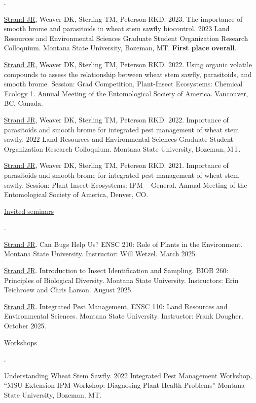 \documentclass[10pt,letterpaper]{article}
\newcounter{cvnumi}
\newenvironment{cvnum}{\begin{list}{\arabic{cvnumi}.}{\usecounter{cvnumi}\setlength{\leftmargin}{2.2em}\setlength{\labelwidth}{1.6em}\setlength{\labelsep}{0.6em}\setlength{\itemsep}{2pt}\setlength{\topsep}{2pt}\setlength{\parsep}{0pt}}}{\end{list}}
\newcommand{\cvsub}[1]{\par\vspace{3pt}\uline{#1}\par\nopagebreak[4]\vspace{3pt}}
\begin{document}
\begin{cvnum}
\item \uline{Strand JR}, Weaver DK, Sterling TM, Peterson RKD. 2023. The importance of smooth brome and parasitoids in wheat stem sawfly biocontrol. 2023 Land Resources and Environmental Sciences Graduate Student Organization Research Colloquium. Montana State University, Bozeman, MT. \textbf{First place overall}.
\item \uline{Strand JR}, Weaver DK, Sterling TM, Peterson RKD. 2022. Using organic volatile compounds to assess the relationship between wheat stem sawfly, parasitoids, and smooth brome. Session: Grad Competition, Plant-Insect Ecosystems: Chemical Ecology 1. Annual Meeting of the Entomological Society of America. Vancouver, BC, Canada.
\item \uline{Strand JR}, Weaver DK, Sterling TM, Peterson RKD. 2022. Importance of parasitoids and smooth brome for integrated pest management of wheat stem sawfly. 2022 Land Resources and Environmental Sciences Graduate Student Organization Research Colloquium. Montana State University, Bozeman, MT.
\item \uline{Strand JR}, Weaver DK, Sterling TM, Peterson RKD. 2021. Importance of parasitoids and smooth brome for integrated pest management of wheat stem sawfly. Session: Plant Insect-Ecosystems: IPM – General. Annual Meeting of the Entomological Society of America, Denver, CO.
\end{cvnum}
\cvsub{Invited seminars}
\begin{cvnum}
\item \uline{Strand JR}. Can Bugs Help Us? ENSC 210: Role of Plants in the Environment. Montana State University. Instructor: Will Wetzel. March 2025.
\item \uline{Strand JR}. Introduction to Insect Identification and Sampling. BIOB 260: Principles of Biological Diversity. Montana State University. Instructors: Erin Teichroew and Chris Larson. August 2025.
\item \uline{Strand JR}. Integrated Pest Management. ENSC 110: Land Resources and Environmental Sciences. Montana State University. Instructor: Frank Dougher. October 2025.
\end{cvnum}
\cvsub{Workshops}
\begin{cvnum}
\item Understanding Wheat Stem Sawfly. 2022 Integrated Pest Management Workshop, “MSU Extension IPM Workshop: Diagnosing Plant Health Problems” Montana State University, Bozeman, MT.
\end{cvnum}
\end{document}
